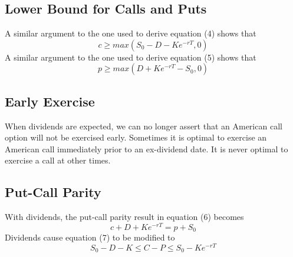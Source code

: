 \documentclass{article}
\begin{document}
\subsection{Lower Bound for Calls and Puts}
A similar argument to the one used to derive equation (4) shows that
\begin{equation}
	c\ge max(S_0-D-Ke^{-rT},0)
\end{equation}
A similar argument to the one used to derive equation (5) shows that
\begin{equation}
	p\ge max(D+Ke^{-rT}-S_0,0)
\end{equation}

\subsection{Early Exercise}
When dividends are expected, we can no longer assert that an American call option will not be exercised early. Sometimes it is optimal to exercise an American call immediately prior to an ex-dividend date. It is never optimal to exercise a call at other times.

\subsection{Put-Call Parity}
With dividends, the put-call parity result in equation (6) becomes
\begin{equation}
	c+D+Ke^{-rT}=p+S_0
\end{equation}
Dividends cause equation (7) to be modified to
\begin{equation}
	S_0-D-K\le C-P\le S_0-Ke^{-rT}
\end{equation}
\end{document}
